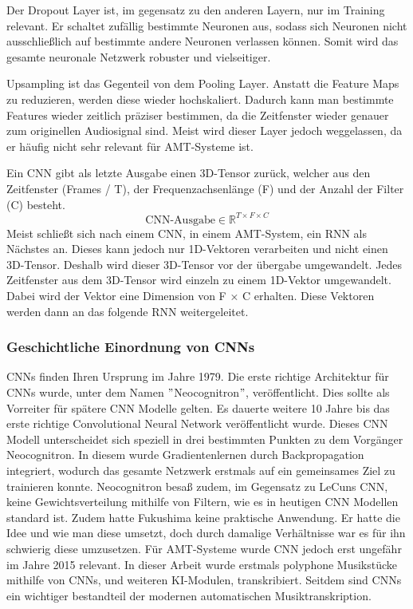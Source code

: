 Der Dropout Layer ist, im gegensatz zu den anderen Layern, nur im Training relevant.
Er schaltet zufällig bestimmte Neuronen aus,
sodass sich Neuronen nicht ausschließlich auf bestimmte andere Neuronen verlassen können.
Somit wird das gesamte neuronale Netzwerk robuster und vielseitiger.

Upsampling ist das Gegenteil von dem Pooling Layer.
Anstatt die Feature Maps zu reduzieren, werden diese wieder hochskaliert.
Dadurch kann man bestimmte Features wieder zeitlich präziser bestimmen,
da die Zeitfenster wieder genauer zum originellen Audiosignal sind.
Meist wird dieser Layer jedoch weggelassen, da er häufig nicht sehr relevant für AMT-Systeme ist.

Ein CNN gibt als letzte Ausgabe einen 3D-Tensor zurück,
welcher aus den Zeitfenster (Frames / T), der Frequenzachsenlänge (F) und der Anzahl der Filter (C) besteht.
\[
\text{CNN-Ausgabe} \in \mathbb{R}^{T \times F \times C}
\]
Meist schließt sich nach einem CNN, in einem AMT-System, ein RNN als Nächstes an.
Dieses kann jedoch nur 1D-Vektoren verarbeiten und nicht einen 3D-Tensor.
Deshalb wird dieser 3D-Tensor vor der übergabe umgewandelt.
Jedes Zeitfenster aus dem 3D-Tensor wird einzeln zu einem 1D-Vektor umgewandelt.
Dabei wird der Vektor eine Dimension von F × C erhalten.
Diese Vektoren werden dann an das folgende RNN weitergeleitet.

\subsubsection{Geschichtliche Einordnung von CNNs}
CNNs finden Ihren Ursprung im Jahre 1979.
Die erste richtige Architektur für CNNs wurde, unter dem Namen \("\)Neocognitron\("\), veröffentlicht.
\cite{fukushima1980neocognitron}
Dies sollte als Vorreiter für spätere CNN Modelle gelten.
Es dauerte weitere 10 Jahre bis das erste richtige Convolutional Neural Network veröffentlicht wurde.
\cite{lecun1989backpropagation}
Dieses CNN Modell unterscheidet sich speziell in drei bestimmten Punkten zu dem Vorgänger Neocognitron.
In diesem wurde Gradientenlernen durch Backpropagation integriert,
wodurch das gesamte Netzwerk erstmals auf ein gemeinsames Ziel zu trainieren konnte.
Neocognitron besaß zudem, im Gegensatz zu LeCuns CNN,
keine Gewichtsverteilung mithilfe von Filtern, wie es in heutigen CNN Modellen standard ist.
Zudem hatte Fukushima keine praktische Anwendung.
Er hatte die Idee und wie man diese umsetzt, doch durch damalige Verhältnisse war es für ihn schwierig diese umzusetzen.
Für AMT-Systeme wurde CNN jedoch erst ungefähr im Jahre 2015 relevant.
\cite{sigtia2016end}
In dieser Arbeit wurde erstmals polyphone Musikstücke mithilfe von CNNs, und weiteren KI-Modulen, transkribiert.
Seitdem sind CNNs ein wichtiger bestandteil der modernen automatischen Musiktranskription.

